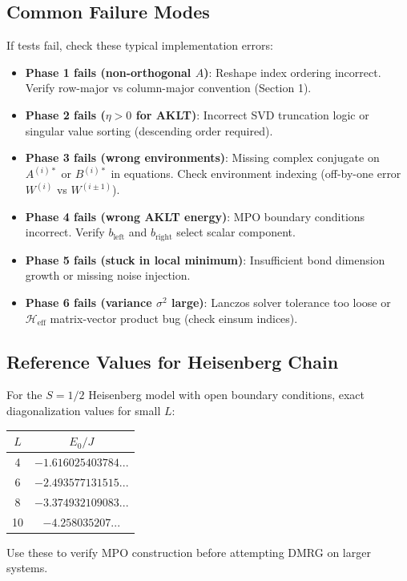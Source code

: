 \documentclass[aps,prb,onecolumn,scriptaddress]{revtex4-2}
\begin{document}
	
	\subsection{Common Failure Modes}
	
	If tests fail, check these typical implementation errors:
	
	\begin{itemize}
		\item \textbf{Phase 1 fails (non-orthogonal $A$)}: Reshape index ordering incorrect. Verify row-major vs column-major convention (Section 1).
		\item \textbf{Phase 2 fails ($\eta > 0$ for AKLT)}: Incorrect SVD truncation logic or singular value sorting (descending order required).
		\item \textbf{Phase 3 fails (wrong environments)}: Missing complex conjugate on $A^{(i)*}$ or $B^{(i)*}$ in equations. Check environment indexing (off-by-one error $W^{(i)}$ vs $W^{(i\pm1)}$).
		\item \textbf{Phase 4 fails (wrong AKLT energy)}: MPO boundary conditions incorrect. Verify $b_{\text{left}}$ and $b_{\text{right}}$ select scalar component.
		\item \textbf{Phase 5 fails (stuck in local minimum)}: Insufficient bond dimension growth or missing noise injection.
		\item \textbf{Phase 6 fails (variance $\sigma^2$ large)}: Lanczos solver tolerance too loose or $\mathcal{H}_{\text{eff}}$ matrix-vector product bug (check einsum indices).
	\end{itemize}
	
	\subsection{Reference Values for Heisenberg Chain}
	For the $S=1/2$ Heisenberg model with open boundary conditions, exact diagonalization values for small $L$:
	\begin{center}
				\begin{tabular}{@{}cc@{}}
			\toprule
			$L$ & $E_0 / J$ \\
			\midrule
			4 & $-1.616025403784...$ \\
			6 & $-2.493577131515...$ \\
			8 & $-3.374932109083...$ \\
			10 & $-4.258035207...$ \\
			\bottomrule
		\end{tabular}
	\end{center}
	Use these to verify MPO construction before attempting DMRG on larger systems.
	
\end{document}
